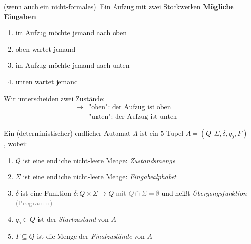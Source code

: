 \documentclass[runningheads,deutsch]{llncs}
\begin{document}
\begin{example} (wenn auch ein nicht-formales): Ein Aufzug mit zwei Stockwerken
    \textbf{Mögliche Eingaben}
    \begin{enumerate}
        \item im Aufzug möchte jemand nach oben
        \item oben wartet jemand 
        \item im Aufzug möchte jemand nach unten
        \item unten wartet jemand
    \end{enumerate}

    Wir unterscheiden zwei Zustände:
    \begin{align*}
        \rightarrow & \text{"oben": der Aufzug ist oben} \\
        & \text{"unten": der Aufzug ist unten}
    \end{align*}

    \begin{center}        
    \end{center}
\end{example}

\begin{definition}
    Ein (deterministischer) endlicher Automat $A$ ist ein $5$-Tupel $A = (Q, \Sigma, \delta, q_0, F)$, wobei:
    \begin{enumerate}
        \item $Q$ ist eine endliche nicht-leere Menge: \textit{Zustandsmenge}
        \item $\Sigma$ ist eine endliche nicht-leere Menge: \textit{Eingabealphabet}
        \item $\delta$ ist eine Funktion $\delta: Q \times \Sigma \mapsto Q$ \textcolor{gray}{mit $Q\cap \Sigma = \emptyset$} und heißt \textit{Übergangsfunktion} \textcolor{gray}{(Programm)}
        \item $q_0 \in Q$ ist der \textit{Startzustand} von $A$
        \item $F \subseteq Q$ ist die Menge der \textit{Finalzustände} von $A$
    \end{enumerate}
\end{definition}
\end{document}
